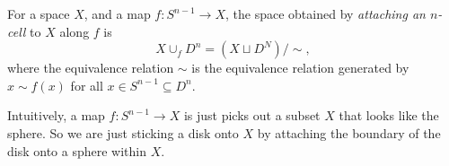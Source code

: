 \documentclass[a4paper]{article}
\begin{document}
\begin{defi}
  For a space $X$, and a map $f: S^{n - 1}\to X$, the space obtained by \emph{attaching an $n$-cell} to $X$ along $f$ is
  \[
    X\cup_{f}D^n = (X\sqcup D^N)/{\sim},
  \]
  where the equivalence relation $\sim$ is the equivalence relation generated by $x\sim f(x)$ for all $x\in S^{n - 1}\subseteq D^n$.

  Intuitively, a map $f: S^{n - 1}\to X$ is just picks out a subset $X$ that looks like the sphere. So we are just sticking a disk onto $X$ by attaching the boundary of the disk onto a sphere within $X$.
  \begin{center}
  \end{center}
\end{defi}
\end{document}
